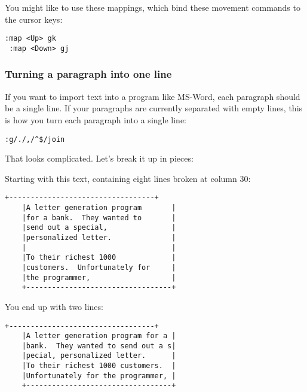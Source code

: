 You might like to use these mappings, which bind these movement commands to the cursor keys:

\begin{Verbatim}[samepage=true]
 :map <Up> gk
 :map <Down> gj
\end{Verbatim}
\subsubsection{Turning a paragraph into one line}
If you want to import text into a program like MS-Word, each paragraph should be a single line.
If your paragraphs are currently separated with empty lines, this is how you turn each paragraph into a single line:

\begin{Verbatim}[samepage=true]
 :g/./,/^$/join
\end{Verbatim}

That looks complicated.
Let's break it up in pieces:

\begin{center}  \end{center}

Starting with this text, containing eight lines broken at column 30:

\begin{Verbatim}[samepage=true]
    +----------------------------------+
    |A letter generation program       |
    |for a bank.  They wanted to       |
    |send out a special,               |
    |personalized letter.              |
    |                                  |
    |To their richest 1000             |
    |customers.  Unfortunately for     |
    |the programmer,                   |
    +----------------------------------+
\end{Verbatim}

You end up with two lines:

\begin{Verbatim}[samepage=true]
    +----------------------------------+
    |A letter generation program for a |
    |bank.  They wanted to send out a s|
    |pecial, personalized letter.      |
    |To their richest 1000 customers.  |
    |Unfortunately for the programmer, |
    +----------------------------------+
\end{Verbatim}

